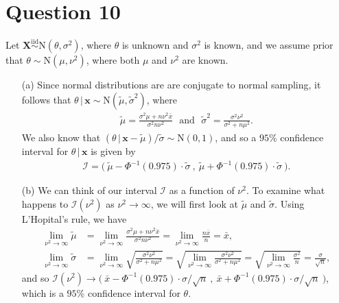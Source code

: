 \documentclass[10pt]{article}
\begin{document}
\section{Question 10} \noindent
Let \(\bm{X} \overset{\mathrm{iid}}{\sim} \mathrm{N}(\theta, \sigma^2)\), where \(\theta\) is unknown and \(\sigma^2\) is known, and we assume prior that 
\(\theta \sim \mathrm{N}(\mu, \nu^2)\), where both \(\mu\) and \(\nu^2\) are known. 
\begin{itemize}
    \item[(a)] Since normal distributions are are conjugate to normal sampling, it follows
    that \(\theta \,|\, \mathbf{x} \sim \mathrm{N}(\tilde{\mu}, \tilde{\sigma}^2)\), where 
    \begin{align*}
        \tilde{\mu}
        = \frac{\sigma^2 \mu + n \nu^2 \bar{x}}{\sigma^2 n \nu^2}
        ~~~\text{and}~~~
        \tilde{\sigma}^2
        = \frac{\sigma^2 \nu^2}{\sigma^2 + n \mu^2}.
    \end{align*}
    We also know that \((\theta \,|\, \mathbf{x} - \tilde{\mu}) / \tilde{\sigma} \sim \mathrm{N}(0,1)\), and so a \(95\)\%{} confidence interval for 
    \(\theta \,|\, \mathbf{x}\) is given by 
    \begin{align*}
        \mathcal{I}
        = \Big( ~ \tilde{\mu} - \Phi^{-1}(0.975) \cdot \tilde{\sigma} ~,~ \tilde{\mu} + \Phi^{-1}(0.975) \cdot \tilde{\sigma} ~ \Big).
    \end{align*} 
    \item[(b)] We can think of our interval \(\mathcal{I}\) as a function of \(\nu^2\). To examine what happens to \(\mathcal{I}(\nu^2)\) as \(\nu^2 \to \infty\), we 
    will first look at \(\tilde{\mu}\) and \(\tilde{\sigma}\). Using L'Hopital's rule, we have
    \begin{align*}
        \lim_{\nu^2 \to \infty} \tilde{\mu}
        &= \lim_{\nu^2 \to \infty} \frac{\sigma^2 \mu + n \nu^2 \bar{x}}{\sigma^2 n \nu^2}
        = \lim_{\nu^2 \to \infty} \frac{n \bar{x}}{n}
        = \bar{x}, \\
        \lim_{\nu^2 \to \infty} \tilde{\sigma}
        &= \lim_{\nu^2 \to \infty} \sqrt{\frac{\sigma^2 \nu^2}{\sigma^2 + n \mu^2}}
        = \sqrt{ \lim_{\nu^2 \to \infty} \frac{\sigma^2 \nu^2}{\sigma^2 + n \mu^2}}
        = \sqrt{ \lim_{\nu^2 \to \infty} \frac{\sigma^2}{n}}
        = \frac{\sigma}{\sqrt{n}},
    \end{align*}
    and so \(\mathcal{I}(\nu^2) \to \big( ~\bar{x} - \Phi^{-1}(0.975) \cdot \sigma / \sqrt{n} ~,~ \bar{x} + \Phi^{-1}(0.975) \cdot \sigma / \sqrt{n} ~ \big)\),
    which is a \(95\)\%{} confidence interval for \(\theta\). 
\end{itemize}
\end{document}
